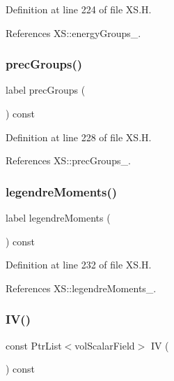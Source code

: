 Definition at line 224 of file X\+S.\+H.



References X\+S\+::energy\+Groups\+\_\+.

\mbox{\label{classFoam_1_1XS_aeb1380355ff0a9cc7ab7e8b55aea673b}} 
\subsubsection{\texorpdfstring{prec\+Groups()}{precGroups()}}
{\footnotesize\ttfamily label prec\+Groups (\begin{DoxyParamCaption}{ }\end{DoxyParamCaption}) const\hspace{0.3cm}{\ttfamily [inline]}}



Definition at line 228 of file X\+S.\+H.



References X\+S\+::prec\+Groups\+\_\+.

\mbox{\label{classFoam_1_1XS_ab1770d82e9777642e1373706c733606d}} 
\subsubsection{\texorpdfstring{legendre\+Moments()}{legendreMoments()}}
{\footnotesize\ttfamily label legendre\+Moments (\begin{DoxyParamCaption}{ }\end{DoxyParamCaption}) const\hspace{0.3cm}{\ttfamily [inline]}}



Definition at line 232 of file X\+S.\+H.



References X\+S\+::legendre\+Moments\+\_\+.

\mbox{\label{classFoam_1_1XS_af7bd963d20dabfe2e8c89aefe489694a}} 
\subsubsection{\texorpdfstring{I\+V()}{IV()}}
{\footnotesize\ttfamily const Ptr\+List$<$vol\+Scalar\+Field$>$ IV (\begin{DoxyParamCaption}{ }\end{DoxyParamCaption}) const\hspace{0.3cm}{\ttfamily [inline]}}



